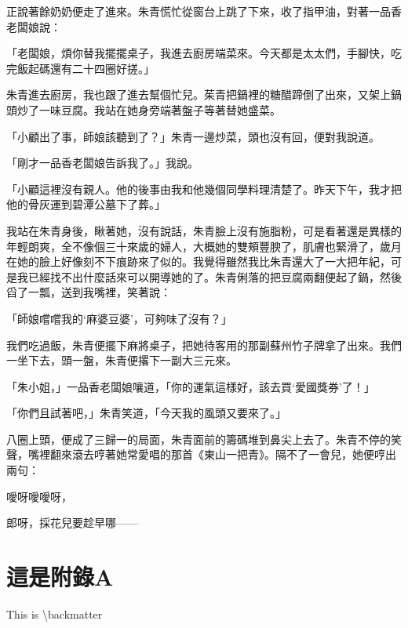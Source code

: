 \documentclass[b5paper,11pt,twoside,twocolumn]{ctexbook}
\begin{document}
正說著餘奶奶便走了進來。朱青慌忙從窗台上跳了下來，收了指甲油，對著一品香老闆娘說：

「老闆娘，煩你替我擺擺桌子，我進去廚房端菜來。今天都是太太們，手腳快，吃完飯起碼還有二十四圈好搓。」

朱青進去廚房，我也跟了進去幫個忙兒。茱青把鍋裡的糖醋蹄倒了出來，又架上鍋頭炒了一味豆腐。我站在她身旁端著盤子等著替她盛菜。

「小顧出了事，師娘該聽到了？」朱青一邊炒菜，頭也沒有回，便對我說道。

「剛才一品香老闆娘告訴我了。」我說。

「小顧這裡沒有親人。他的後事由我和他幾個同學料理清楚了。昨天下午，我才把他的骨灰運到碧潭公墓下了葬。」

我站在朱青身後，瞅著她，沒有說話，朱青臉上沒有施脂粉，可是看著還是異樣的年輕朗爽，全不像個三十來歲的婦人，大概她的雙頰豐腴了，肌膚也緊滑了，歲月在她的臉上好像刻不下痕跡來了似的。我覺得雖然我比朱青還大了一大把年紀，可是我已經找不出什麼話來可以開導她的了。朱青俐落的把豆腐兩翻便起了鍋，然後舀了一瓢，送到我嘴裡，笑著說：

「師娘嚐嚐我的‘麻婆豆婆’，可夠味了沒有？」

我們吃過飯，朱青便擺下麻將桌子，把她待客用的那副蘇州竹子牌拿了出來。我們一坐下去，頭一盤，朱青便撂下一副大三元來。

「朱小姐，」一品香老闆娘嚷道，「你的運氣這樣好，該去買‘愛國獎券’了！」

「你們且試著吧，」朱青笑道，「今天我的風頭又要來了。」

八圈上頭，便成了三歸一的局面，朱青面前的籌碼堆到鼻尖上去了。朱青不停的笑聲，嘴裡翻來滾去哼著她常愛唱的那首《東山一把青》。隔不了一會兒，她便哼出兩句：

噯呀噯噯呀，

郎呀，採花兒要趁早哪——

\renewcommand{\appendixname}{附錄}
\appendix
\chapter{這是附錄A}

\backmatter
This is \textbackslash backmatter
\end{document}
